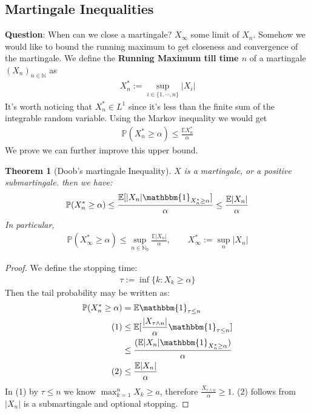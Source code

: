 \documentclass[a4paper,11pt]{book}
\newtheorem{theorem}{Theorem}[section]
\theoremstyle{definition}
\theoremstyle{remark}
\begin{document}
\subsection{Martingale Inequalities}
\textbf{Question}: When can we close a martingale? $X_\infty$ some limit of $X_n$. Somehow we would like to bound the running maximum to get closeness and convergence of the martingale. We define the \textbf{Running Maximum till time $n$} of a martingale $(X_n)_{n \in \mathbb{N}}$ as 
\begin{align*}
	X^*_n:= \sup_{i\in \{1, \cdots, n\}} |X_i|
\end{align*}
It's worth noticing that $X^*_n \in L^1$ since it's less than the finite sum of the integrable random variable.
Using the Markov inequality we would get
\begin{align*}
	\mathbb{P}(X^*_n \geq \alpha)\leq \frac{\mathbb{E}X^*_n}{\alpha}
\end{align*} 
We prove we can further improve this upper bound.

\begin{theorem}[Doob's martingale Inequality]
$X$ is a martingale, or a positive submartingale. then we have:
\begin{align*}
	\mathbb{P}(X^*_n \geq \alpha) \leq \frac{\mathbb{E}[|X_n|\mathbbm{1}_{X^*_n \geq \alpha}]} {\alpha} \leq \frac{\mathbb{E}|X_n|}{\alpha}
\end{align*}	
In particular,
\begin{align*}
	\mathbb{P}(X_\infty^* \ge \alpha) \le \sup_{ n \in \mathbb{N}_0} \frac{\mathbb{E}|X_n|}{\alpha}, \qquad X_\infty^* := \sup_{n} |X_n|
\end{align*}
\end{theorem}
\begin{proof}
	We define the stopping time:
	\begin{align*}
		\tau:= \inf\{k: X_k \geq \alpha\}
	\end{align*}
	Then the tail probability may be written as:
	\begin{align*}
		\mathbb{P}(X^*_n \geq \alpha) &= \mathbb{E} \mathbbm{1}_{\tau \le n}\\
	(1)	&\leq \mathbb{E}[ \frac{|X_{\tau \wedge n}|}{\alpha}\mathbbm{1}_{\tau \le n}]\\
	&\leq \frac{ (\mathbb{E}|X_n| \mathbbm{1}_{X_n^* \ge \alpha})}{\alpha}  \\
	(2)	&\leq \frac{\mathbb{E}|X_n|}{\alpha}
	\end{align*}
	In (1) by $\tau \leq n $ we know $\max_{k = 1}^n X_k \geq a$, therefore $\frac{X_{\tau \wedge n}}{\alpha} \geq 1$. (2) follows from $|X_n|$ is a submartingale and optional stopping.
\end{proof}
\end{document}
